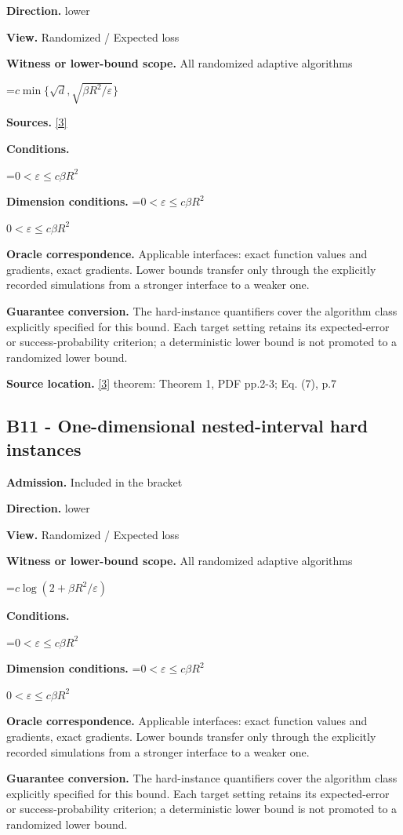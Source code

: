 \documentclass[10pt,a4paper]{article}
\newcommand{\AtlasMath}[1]{\par\begingroup\centering\setbox0=\hbox{$\displaystyle #1$}\ifdim\wd0>1.4\linewidth\typeout{ATLAS WIDE FORMULA: \the\wd0}\fi\ifdim\wd0>\linewidth\resizebox{\linewidth}{!}{\box0}\else\box0\fi\par\endgroup}
\newcommand{\AtlasInlineMath}[1]{\begingroup\setbox0=\hbox{$#1$}\ifdim\wd0>.4\linewidth\endgroup\AtlasMath{#1}\else\endgroup$#1$\fi}
\begin{document}
\textbf{Direction.} lower

\textbf{View.} Randomized / Expected loss

\textbf{Witness or lower-bound scope.} All randomized adaptive algorithms

\AtlasMath{c\min\{\sqrt d,\sqrt{\beta R^2/\varepsilon}\}}
\textbf{Sources.} \href{https://arxiv.org/pdf/2609.10874}{[3]}

\textbf{Conditions.} 
\AtlasMath{0<\varepsilon\le c\beta R^2}


\textbf{Dimension conditions.} \AtlasInlineMath{0<\varepsilon\le c\beta R^2}

\textbf{Oracle correspondence.} Applicable interfaces: exact function values and gradients, exact gradients. Lower bounds transfer only through the explicitly recorded simulations from a stronger interface to a weaker one.

\textbf{Guarantee conversion.} The hard-instance quantifiers cover the algorithm class explicitly specified for this bound. Each target setting retains its expected-error or success-probability criterion; a deterministic lower bound is not promoted to a randomized lower bound.

\textbf{Source location.} \href{https://arxiv.org/pdf/2609.10874}{[3]} theorem: Theorem 1, PDF pp.2-3; Eq. (7), p.7

\subsection{B11 - One-dimensional nested-interval hard instances}
\textbf{Admission.} Included in the bracket

\textbf{Direction.} lower

\textbf{View.} Randomized / Expected loss

\textbf{Witness or lower-bound scope.} All randomized adaptive algorithms

\AtlasMath{c\log(2+\beta R^2/\varepsilon)}
\textbf{Conditions.} 
\AtlasMath{0<\varepsilon\le c\beta R^2}


\textbf{Dimension conditions.} \AtlasInlineMath{0<\varepsilon\le c\beta R^2}

\textbf{Oracle correspondence.} Applicable interfaces: exact function values and gradients, exact gradients. Lower bounds transfer only through the explicitly recorded simulations from a stronger interface to a weaker one.

\textbf{Guarantee conversion.} The hard-instance quantifiers cover the algorithm class explicitly specified for this bound. Each target setting retains its expected-error or success-probability criterion; a deterministic lower bound is not promoted to a randomized lower bound.
\end{document}
